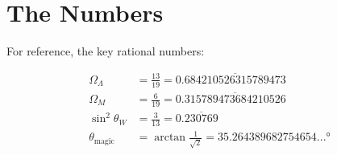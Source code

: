 \documentclass[12pt,a4paper]{article}
\newcommand{\OmegaL}{\Omega_\Lambda}
\newcommand{\OmegaM}{\Omega_M}
\newcommand{\sinW}{\sin^2\theta_W}
\begin{document}
\section{The Numbers}

For reference, the key rational numbers:

\begin{align}
\OmegaL &= \frac{13}{19} = 0.\overline{684210526315789473} \\
\OmegaM &= \frac{6}{19} = 0.\overline{315789473684210526} \\
\sinW &= \frac{3}{13} = 0.\overline{230769} \\
\theta_{\text{magic}} &= \arctan\frac{1}{\sqrt{2}} = 35.264389682754654...°
\end{align}
\end{document}
